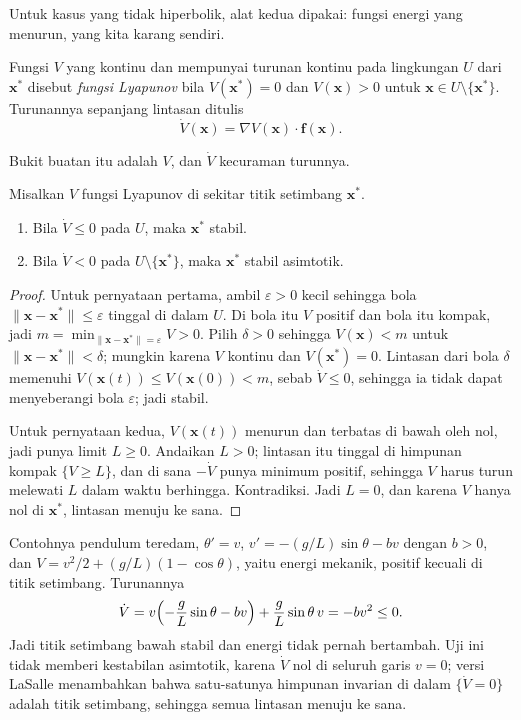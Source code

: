 Untuk kasus yang tidak hiperbolik, alat kedua dipakai: fungsi energi yang
menurun, yang kita karang sendiri.

\begin{definisi}
Fungsi $V$ yang kontinu dan mempunyai turunan kontinu pada lingkungan $U$ dari
$\mathbf{x}^{*}$ disebut \emph{fungsi Lyapunov} bila $V(\mathbf{x}^{*})=0$ dan
$V(\mathbf{x})>0$ untuk $\mathbf{x}\in U\setminus\{\mathbf{x}^{*}\}$. Turunannya
sepanjang lintasan ditulis
\[
\dot V(\mathbf{x})=\nabla V(\mathbf{x})\cdot\mathbf{f}(\mathbf{x}).
\]
\end{definisi}

Bukit buatan itu adalah $V$, dan $\dot V$ kecuraman turunnya.

\begin{teorema}
Misalkan $V$ fungsi Lyapunov di sekitar titik setimbang $\mathbf{x}^{*}$.
\begin{enumerate}
\item Bila $\dot V\le0$ pada $U$, maka $\mathbf{x}^{*}$ stabil.
\item Bila $\dot V<0$ pada $U\setminus\{\mathbf{x}^{*}\}$, maka
  $\mathbf{x}^{*}$ stabil asimtotik.
\end{enumerate}
\end{teorema}

\begin{proof}
Untuk pernyataan pertama, ambil $\varepsilon>0$ kecil sehingga bola
$\|\mathbf{x}-\mathbf{x}^{*}\|\le\varepsilon$ tinggal di dalam $U$. Di bola
itu $V$ positif dan bola itu kompak, jadi
$m=\min_{\|\mathbf{x}-\mathbf{x}^{*}\|=\varepsilon}V>0$. Pilih $\delta>0$
sehingga $V(\mathbf{x})<m$ untuk $\|\mathbf{x}-\mathbf{x}^{*}\|<\delta$;
mungkin karena $V$ kontinu dan $V(\mathbf{x}^{*})=0$. Lintasan dari bola $\delta$
memenuhi $V(\mathbf{x}(t))\le V(\mathbf{x}(0))<m$, sebab $\dot V\le0$,
sehingga ia tidak dapat menyeberangi bola $\varepsilon$; jadi stabil.

Untuk pernyataan kedua, $V(\mathbf{x}(t))$ menurun dan terbatas di bawah oleh
nol, jadi punya limit $L\ge0$. Andaikan $L>0$; lintasan itu tinggal di himpunan
kompak $\{V\ge L\}$, dan di sana $-\dot V$ punya minimum positif, sehingga $V$
harus turun melewati $L$ dalam waktu berhingga. Kontradiksi. Jadi $L=0$, dan
karena $V$ hanya nol di $\mathbf{x}^{*}$, lintasan menuju ke sana.
\end{proof}

Contohnya pendulum teredam, $\theta'=v$, $v'=-(g/L)\sin\theta-bv$ dengan
$b>0$, dan $V=v^{2}/2+(g/L)(1-\cos\theta)$, yaitu energi mekanik, positif
kecuali di titik setimbang. Turunannya
\[
\dot V=v\Bigl(-\frac{g}{L}\sin\theta-bv\Bigr)+\frac{g}{L}\sin\theta\,v=-bv^{2}\le0 .
\]
Jadi titik setimbang bawah stabil dan energi tidak pernah bertambah. Uji ini
tidak memberi kestabilan asimtotik, karena $\dot V$ nol di seluruh garis $v=0$;
versi LaSalle menambahkan bahwa satu-satunya himpunan invarian
di dalam $\{\dot V=0\}$ adalah titik setimbang, sehingga semua lintasan menuju
ke sana.

